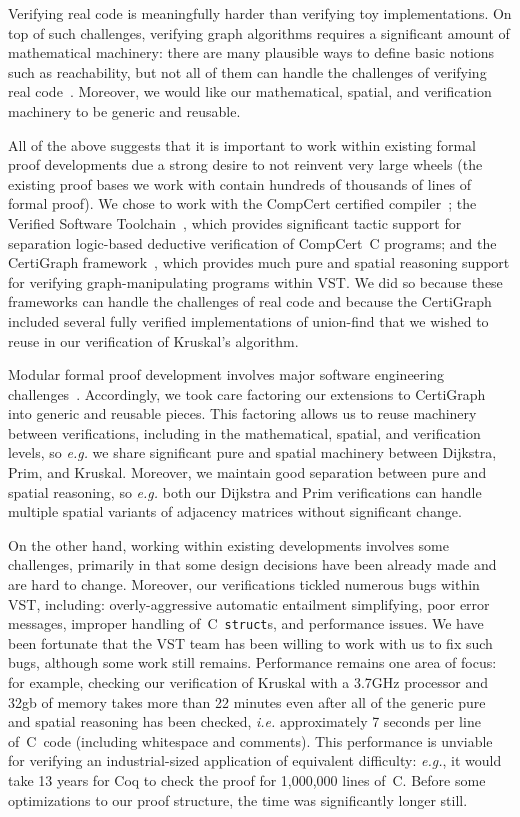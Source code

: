 Verifying real code is meaningfully harder than verifying toy implementations.  On top of such challenges, verifying graph algorithms requires a significant amount of mathematical machinery: there are many plausible ways to define basic notions such as reachability, but not all of them can handle the challenges of verifying real code~\cite{shengyi:thesis}.  Moreover, we would like our mathematical, spatial, and verification machinery to be generic and reusable.

All of the above suggests that it is important to work within existing formal proof developments due a strong desire to not reinvent very large wheels (the existing proof bases we work with contain hundreds of thousands of lines of formal proof).  We chose to work with the CompCert certified compiler~\cite{leroy:compcert}; the Verified Software Toolchain~\cite{appel:programlogics}, which provides significant tactic support for separation logic-based deductive verification of CompCert~C programs; and the CertiGraph framework~\cite{DBLP:journals/pacmpl/WangCMH19}, which provides much pure and spatial reasoning support for verifying graph-manipulating programs within VST.  We did so because these frameworks can handle the challenges of real code and because the CertiGraph included several fully verified implementations of union-find that we wished to reuse in our verification of Kruskal's algorithm.

Modular formal proof development involves major software engineering challenges~\cite{DBLP:journals/corr/abs-2003-06458}.
Accordingly, we took care factoring our extensions to CertiGraph into generic and reusable pieces.  This factoring allows us to reuse machinery between verifications, including in the mathematical, spatial, and verification levels, so \emph{e.g.} we share significant pure and spatial machinery between Dijkstra, Prim, and Kruskal.  Moreover, we maintain good separation between pure and spatial reasoning, so \emph{e.g.} both our Dijkstra and Prim verifications can handle multiple spatial variants of adjacency matrices without significant change.

On the other hand, working within existing developments involves some challenges, primarily in that some design decisions have been already made and are hard to change.  Moreover, our verifications tickled numerous bugs within VST, including: overly-aggressive automatic entailment simplifying, poor error messages, improper handling of~C~\texttt{struct}s, and performance issues.  We have been fortunate that the VST team has been willing to work with us to fix such bugs, although some work still remains.  Performance remains one area of focus: for example, checking our verification of Kruskal with a 3.7GHz processor and 32gb of memory takes more than 22 minutes even after all of the generic pure and spatial reasoning has been checked, \emph{i.e.} approximately 7 seconds per line of~C~code (including whitespace and comments).  This performance is unviable for verifying an industrial-sized application of equivalent difficulty: \emph{e.g.}, it would take 13 years for Coq to check the proof for 1,000,000 lines of~C.  Before some optimizations to our proof structure, the time was significantly longer still.

